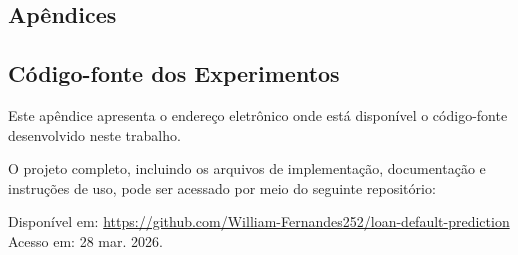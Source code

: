 \begin{apendicesenv}
  \renewcommand{\partapendices}{
  \part*{Apêndices}}
  \partapendices

  \chapter{Código-fonte dos Experimentos}

  Este apêndice apresenta o endereço eletrônico onde está disponível o código-fonte desenvolvido neste trabalho.

  O projeto completo, incluindo os arquivos de implementação, documentação e instruções de uso, pode ser acessado por meio do seguinte repositório:

  \begin{flushleft}
    Disponível em: \url{https://github.com/William-Fernandes252/loan-default-prediction} \\
    Acesso em: 28 mar. 2026.
  \end{flushleft}
\end{apendicesenv}
